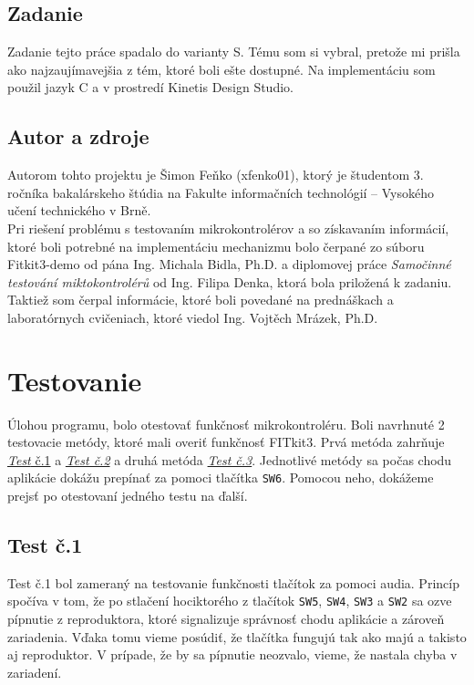 \documentclass[11pt,a4paper]{article}
\begin{document}
    \subsection{Zadanie}

        \indent Zadanie tejto práce spadalo do varianty S. Tému som si vybral, pretože mi prišla ako najzaujímavejšia z tém, ktoré boli ešte dostupné. Na implementáciu som použil jazyk C a v prostredí Kinetis Design Studio.

    \subsection{Autor a zdroje}

        \indent Autorom tohto projektu je Šimon Feňko (xfenko01), ktorý je študentom 3. ročníka bakalárskeho štúdia na Fakulte informačních technológií – Vysokého učení technického v Brně.\textcolor{blue}{\cite{VUT}} \\[0.4em]
        \indent Pri riešení problému s testovaním mikrokontrolérov a so získavaním informácií, ktoré boli potrebné na implementáciu mechanizmu bolo čerpané zo súboru Fitkit3-demo od pána Ing. Michala Bidla, Ph.D. a diplomovej práce \textit{Samočinné testování miktokontrolérů}\textcolor{blue}{\cite{DENK}} od Ing. Filipa Denka, ktorá bola priložená k zadaniu. Taktiež som čerpal informácie, ktoré boli povedané na prednáškach\textcolor{blue}{\cite{IMP}} a laboratórnych cvičeniach, ktoré viedol Ing. Vojtěch Mrázek, Ph.D.


\section{Testovanie}

    \indent Úlohou programu, bolo otestovať funkčnosť mikrokontroléru. Boli navrhnuté 2 testovacie metódy, ktoré mali overiť funkčnosť FITkit3. Prvá metóda zahrňuje \hyperlink{label}{\textit{Test} č.1} a \hyperlink{label}{\textit{Test č.2}} a druhá metóda \hyperlink{label}{\textit{Test č.3}}. Jednotlivé metódy sa počas chodu aplikácie dokážu prepínať za pomoci tlačítka \texttt{SW6}. Pomocou neho, dokážeme prejsť po otestovaní jedného testu na ďalší.
    
    \subsection{Test č.1}
    
        \indent \hypertarget{label}{Test č.1} bol zameraný na testovanie funkčnosti tlačítok za pomoci audia. Princíp spočíva v tom, že po stlačení hociktorého z tlačítok \texttt{SW5}, \texttt{SW4}, \texttt{SW3} a \texttt{SW2} sa ozve pípnutie z reproduktora, ktoré signalizuje správnosť chodu aplikácie a zároveň zariadenia. Vďaka tomu vieme posúdiť, že tlačítka fungujú tak ako majú a takisto aj reproduktor. V prípade, že by sa pípnutie neozvalo, vieme, že nastala chyba v zariadení.
        
\end{document}
